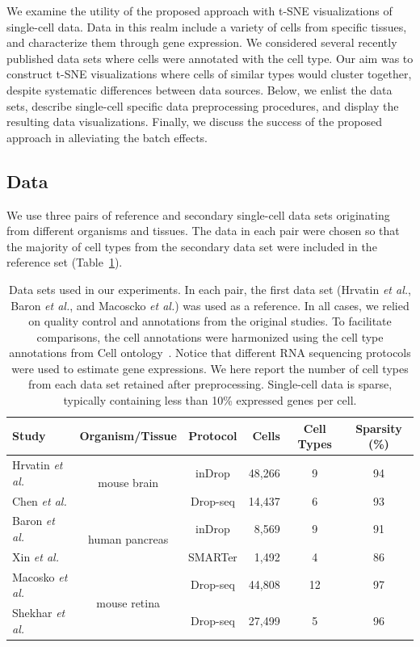 \documentclass[runningheads]{llncs}
\newcommand{\etal}{\textit{et al.}}
\begin{document}
We examine the utility of the proposed approach with t-SNE visualizations of
single-cell data. Data in this realm include a variety of
cells from specific tissues, and characterize them through gene expression. 
We considered several recently published data
sets where cells were annotated with the cell type. Our aim was to construct
t-SNE visualizations where cells of similar types would cluster together,
despite systematic differences between data sources. Below, we enlist the data sets,
describe single-cell specific data preprocessing procedures, and display the
resulting data visualizations. Finally, we discuss the success of the proposed
approach in alleviating the batch effects.


\subsection{Data}

We use three pairs of reference and secondary single-cell data sets originating
from different organisms and tissues. The data in each pair were chosen so that
the majority of cell types from the secondary data set were included in the
reference set (Table~\ref{tab:datasets}).

\begin{table}[ht]
\begin{center}
\setlength\tabcolsep{4pt}
\begin{tabular}{l c c r c c}
\toprule
Study & Organism/Tissue & Protocol & Cells & Cell Types & Sparsity (\%) \\
\midrule
Hrvatin \etal & \multirow{2}{*}{mouse brain} & inDrop & 48,266 & 9 & 94 \\
Chen \etal & & Drop-seq & 14,437 & 6 & 93 \\[5pt]
Baron \etal & \multirow{2}{*}{human pancreas} & inDrop & 8,569 & 9 & 91 \\
Xin \etal & & SMARTer & 1,492 & 4 & 86 \\[5pt]
Macosko \etal & \multirow{2}{*}{mouse retina} & Drop-seq & 44,808 & 12 & 97 \\
Shekhar \etal & & Drop-seq & 27,499 & 5 & 96 \\
\bottomrule
\end{tabular}
\end{center}
\caption{Data sets used in our experiments. In each pair, the first data set
(Hrvatin \etal, Baron \etal, and Macoscko \etal) was used as a reference. In
all cases, we relied on quality control and annotations from the original
studies. To facilitate comparisons, the cell annotations were harmonized using
the cell type annotations from Cell ontology~\cite{cell_ontology}. Notice that
different RNA sequencing protocols were used to estimate gene expressions. We
here report the number of cell types from each data set retained after
preprocessing. Single-cell data is sparse, typically containing less than 10\%
expressed genes per cell.}
\label{tab:datasets}
\end{table}
\end{document}
